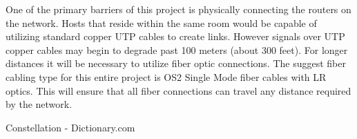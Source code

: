 \documentclass[12pt]{article}
\begin{document}
One of the primary barriers of this project is physically connecting the routers on the network. Hosts that reside within the same room would be capable
of utilizing standard copper UTP cables to create links. However signals over UTP copper cables may begin to degrade past 100 meters (about 300 feet). 
For longer distances it will be necessary to utilize fiber optic connections. The suggest fiber cabling type for this entire project is OS2 Single Mode
fiber cables with LR optics. This will ensure that all fiber connections can travel any distance required by the network. 


\begin{thebibliography}{10}
Constellation - Dictionary.com


\end{thebibliography}
\end{document}
